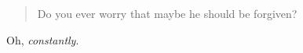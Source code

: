 \begin{quote}
Do you ever worry that maybe he should be forgiven?
\end{quote}

Oh, \emph{constantly}.
